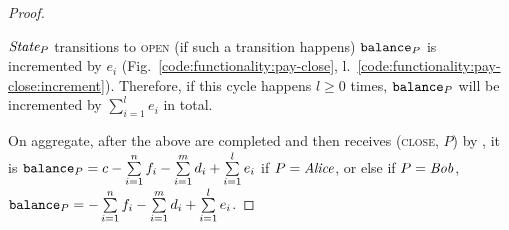 \begin{proof}
\begin{itemize}
    $\itistate_P$ transitions to \textsc{open} (if such a transition happens)
    $\texttt{balance}_{P}$ is incremented by $e_i$
    (Fig.~\ref{code:functionality:pay-close},
    l.~\ref{code:functionality:pay-close:increment}). Therefore, if this cycle
    happens $l \geq 0$ times, $\texttt{balance}_{P}$ will be incremented by
    $\sum\limits_{i=1}^l e_i$ in total.
  \end{itemize}
  On aggregate, after the above are completed and then \fchan receives
  (\textsc{close}, $P$) by \simulator, it is $\texttt{balance}_{P} = c -
  \sum\limits_{i=1}^n f_i - \sum\limits_{i=1}^m d_i + \sum\limits_{i=1}^l e_i$
  if $P = \mathit{Alice}$, or else if $P = \mathit{Bob}$, $\texttt{balance}_{P} = - \sum\limits_{i=1}^n
  f_i - \sum\limits_{i=1}^m d_i + \sum\limits_{i=1}^l e_i$.
\end{proof}
